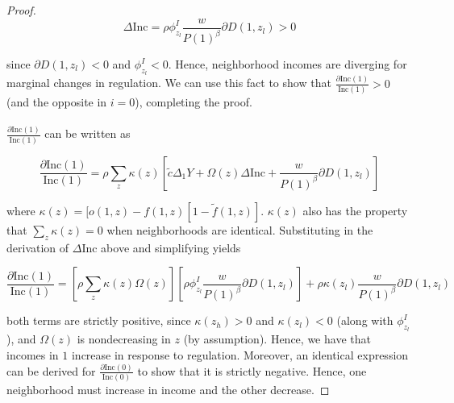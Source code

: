 \documentclass[12pt]{article}
\begin{document}
\begin{enumerate}
\begin{proof}
			\begin{equation*}
				\Delta \text{Inc} = \rho\phi^{I}_{z_{l}}\frac{w}{P(1)^{\beta}}\partial D(1, z_{l}) > 0
			\end{equation*}
			
			since $\partial D(1, z_{l}) < 0$ and $\phi^{I}_{z_{l}} < 0$. Hence, neighborhood incomes are diverging for marginal changes in regulation. We can use this fact to show that $\frac{\partial \text{Inc}(1)}{\text{Inc}(1)} >0$ (and the opposite in $i= 0$), completing the proof. 
			
			\paragraph*{}
			$\frac{\partial \text{Inc}(1)}{\text{Inc}(1)}$ can be written as 
			
			\begin{equation*}
				\frac{\partial \text{Inc}(1)}{\text{Inc}(1)} = \rho \sum_{z}\kappa(z)[\tilde{c}\Delta_{1}Y + \Omega(z)\Delta \text{Inc} + \frac{w}{P(1)^{\beta}}\partial D(1, z_{l})]
			\end{equation*}
			
			where $\kappa(z) = [o(1, z) - f(1, z)[1-\tilde{f}(1, z)]$. $\kappa(z)$ also has the property that $\sum_{z}\kappa(z) = 0$ when neighborhoods are identical. Substituting in the derivation of $\Delta \text{Inc}$ above and simplifying yields
			
			\begin{equation*}
				\frac{\partial \text{Inc}(1)}{\text{Inc}(1)} = [\rho \sum_{z}\kappa(z)\Omega(z)][\rho\phi^{I}_{z_{l}}\frac{w}{P(1)^{\beta}}\partial D(1, z_{l})] + \rho\kappa(z_{l})\frac{w}{P(1)^{\beta}}\partial D(1, z_{l})
			\end{equation*} 
			
			both terms are strictly positive, since $\kappa(z_{h}) > 0$ and $\kappa(z_{l}) < 0$ (along with $\phi^{I}_{z_{l}}$), and $\Omega(z)$ is nondecreasing in $z$ (by assumption). Hence, we have that incomes in $1$ increase in response to regulation. Moreover, an identical expression can be derived for $\frac{\partial \text{Inc}(0)}{\text{Inc}(0)}$ to show that it is strictly negative. Hence, one neighborhood must increase in income and the other decrease. 
			

\end{proof}
\end{enumerate}
\end{document}
